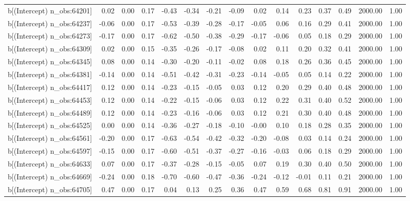 \begin{table}[ht]
\begin{tabular}{rrrrrrrrrrrrrrr}
  b[(Intercept) n\_obs:64201] & 0.02 & 0.00 & 0.17 & -0.43 & -0.34 & -0.21 & -0.09 & 0.02 & 0.14 & 0.23 & 0.37 & 0.49 & 2000.00 & 1.00 \\ 
  b[(Intercept) n\_obs:64237] & -0.06 & 0.00 & 0.17 & -0.53 & -0.39 & -0.28 & -0.17 & -0.05 & 0.06 & 0.16 & 0.29 & 0.41 & 2000.00 & 1.00 \\ 
  b[(Intercept) n\_obs:64273] & -0.17 & 0.00 & 0.17 & -0.62 & -0.50 & -0.38 & -0.29 & -0.17 & -0.06 & 0.05 & 0.18 & 0.29 & 2000.00 & 1.00 \\ 
  b[(Intercept) n\_obs:64309] & 0.02 & 0.00 & 0.15 & -0.35 & -0.26 & -0.17 & -0.08 & 0.02 & 0.11 & 0.20 & 0.32 & 0.41 & 2000.00 & 1.00 \\ 
  b[(Intercept) n\_obs:64345] & 0.08 & 0.00 & 0.14 & -0.30 & -0.20 & -0.11 & -0.02 & 0.08 & 0.18 & 0.26 & 0.36 & 0.45 & 2000.00 & 1.00 \\ 
  b[(Intercept) n\_obs:64381] & -0.14 & 0.00 & 0.14 & -0.51 & -0.42 & -0.31 & -0.23 & -0.14 & -0.05 & 0.05 & 0.14 & 0.22 & 2000.00 & 1.00 \\ 
  b[(Intercept) n\_obs:64417] & 0.12 & 0.00 & 0.14 & -0.23 & -0.15 & -0.05 & 0.03 & 0.12 & 0.20 & 0.29 & 0.40 & 0.48 & 2000.00 & 1.00 \\ 
  b[(Intercept) n\_obs:64453] & 0.12 & 0.00 & 0.14 & -0.22 & -0.15 & -0.06 & 0.03 & 0.12 & 0.22 & 0.31 & 0.40 & 0.52 & 2000.00 & 1.00 \\ 
  b[(Intercept) n\_obs:64489] & 0.12 & 0.00 & 0.14 & -0.23 & -0.16 & -0.06 & 0.03 & 0.12 & 0.21 & 0.30 & 0.40 & 0.48 & 2000.00 & 1.00 \\ 
  b[(Intercept) n\_obs:64525] & 0.00 & 0.00 & 0.14 & -0.36 & -0.27 & -0.18 & -0.10 & -0.00 & 0.10 & 0.18 & 0.28 & 0.35 & 2000.00 & 1.00 \\ 
  b[(Intercept) n\_obs:64561] & -0.20 & 0.00 & 0.17 & -0.63 & -0.54 & -0.42 & -0.32 & -0.20 & -0.08 & 0.03 & 0.14 & 0.24 & 2000.00 & 1.00 \\ 
  b[(Intercept) n\_obs:64597] & -0.15 & 0.00 & 0.17 & -0.60 & -0.51 & -0.37 & -0.27 & -0.16 & -0.03 & 0.06 & 0.18 & 0.29 & 2000.00 & 1.00 \\ 
  b[(Intercept) n\_obs:64633] & 0.07 & 0.00 & 0.17 & -0.37 & -0.28 & -0.15 & -0.05 & 0.07 & 0.19 & 0.30 & 0.40 & 0.50 & 2000.00 & 1.00 \\ 
  b[(Intercept) n\_obs:64669] & -0.24 & 0.00 & 0.18 & -0.70 & -0.60 & -0.47 & -0.36 & -0.24 & -0.12 & -0.01 & 0.11 & 0.21 & 2000.00 & 1.00 \\ 
  b[(Intercept) n\_obs:64705] & 0.47 & 0.00 & 0.17 & 0.04 & 0.13 & 0.25 & 0.36 & 0.47 & 0.59 & 0.68 & 0.81 & 0.91 & 2000.00 & 1.00 \\ 

\end{tabular}
\end{table}

